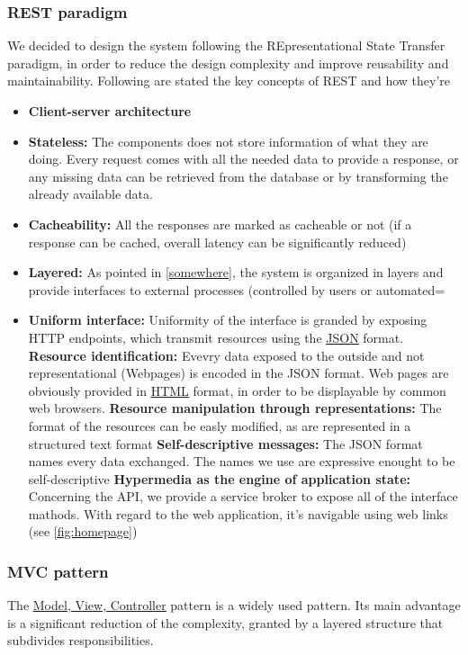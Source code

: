 \documentclass{article}
\newcommand{\link}[2]{{\color{blue}\underline{\href{#1}{#2}}}}
\begin{document}
		\subsubsection{REST paradigm}
			We decided to design the system following the REpresentational State Transfer paradigm, 				in order to reduce the design complexity and improve reusability and maintainability.
			Following are stated the key concepts of REST and how they're 
			\begin{itemize}
				\item \textbf{Client-server architecture}
				\item \textbf{Stateless:} 
					The components does not store information of what they are doing. Every request comes with all the needed data to
					provide a response, or any missing data can be retrieved from the database or by transforming the already available
					data.
				\item \textbf{Cacheability:} 
					All the responses are marked as cacheable or not (if a response can be cached, overall 
					latency can be significantly reduced)
				\item \textbf{Layered:} 
					As pointed in \ref{somewhere}, the system is organized in layers and provide
					interfaces to external processes (controlled by users or automated=
				\item \textbf{Uniform interface:} 
					Uniformity of the interface is granded by exposing HTTP endpoints, which transmit resources using
					the \link{https://json.org/json-en.html}{JSON} format.
					\subitem \textbf{Resource identification:} 
						Evevry data exposed to the outside and not representational (Webpages) is 
						encoded in the JSON format. Web pages are obviously provided in 
						\link{https://en.wikipedia.org/wiki/HTML}{HTML} format, in order to be displayable by
						common web browsers.
					\subitem \textbf{Resource manipulation through representations:}
						The format of the resources can be easly modified, as are represented
						in a structured text format
					\subitem \textbf{Self-descriptive messages:}
						The JSON format names every data exchanged. The names we use are
						expressive enought to be self-descriptive
					\subitem \textbf{Hypermedia as the engine of application state:}
						Concerning the API, we provide a service broker to expose all of the
						interface mathods. With regard to the web application, it's navigable 
						using web links (see \ref{fig:homepage})
			\end{itemize}
		\subsubsection{MVC pattern}
			The \link{https://en.wikipedia.org/wiki/Model-view-controller}{Model, View, Controller} pattern is a widely 
			used pattern. Its main advantage is a significant reduction of the complexity, granted by a layered
			structure that subdivides responsibilities.
\end{document}

